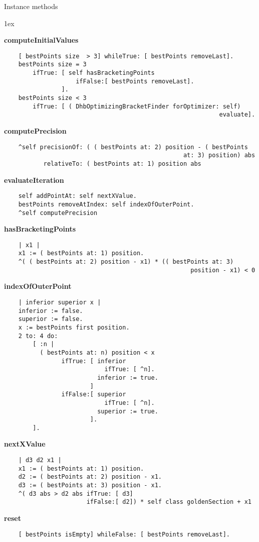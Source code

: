 Instance methods
{\parskip 1ex\par\noindent}
{\bf computeInitialValues}
\begin{verbatim}
    [ bestPoints size  > 3] whileTrue: [ bestPoints removeLast].
    bestPoints size = 3
        ifTrue: [ self hasBracketingPoints
                    ifFalse:[ bestPoints removeLast].
                ].
    bestPoints size < 3
        ifTrue: [ ( DhbOptimizingBracketFinder forOptimizer: self) 
                                                            evaluate].

\end{verbatim}
{\bf computePrecision}
\begin{verbatim}
    ^self precisionOf: ( ( bestPoints at: 2) position - ( bestPoints 
                                                  at: 3) position) abs
           relativeTo: ( bestPoints at: 1) position abs

\end{verbatim}
{\bf evaluateIteration}
\begin{verbatim}
    self addPointAt: self nextXValue.
    bestPoints removeAtIndex: self indexOfOuterPoint.
    ^self computePrecision

\end{verbatim}
{\bf hasBracketingPoints}
\begin{verbatim}
    | x1 |
    x1 := ( bestPoints at: 1) position.
    ^( ( bestPoints at: 2) position - x1) * (( bestPoints at: 3) 
                                                    position - x1) < 0

\end{verbatim}
{\bf indexOfOuterPoint}
\begin{verbatim}
    | inferior superior x |
    inferior := false.
    superior := false.
    x := bestPoints first position.
    2 to: 4 do:
        [ :n |
          ( bestPoints at: n) position < x
                ifTrue: [ inferior
                            ifTrue: [ ^n].
                          inferior := true.
                        ]
                ifFalse:[ superior
                            ifTrue: [ ^n].
                          superior := true.
                        ].
        ].

\end{verbatim}
{\bf nextXValue}
\begin{verbatim}
    | d3 d2 x1 |
    x1 := ( bestPoints at: 1) position.
    d2 := ( bestPoints at: 2) position - x1.
    d3 := ( bestPoints at: 3) position - x1.
    ^( d3 abs > d2 abs ifTrue: [ d3]
                       ifFalse:[ d2]) * self class goldenSection + x1

\end{verbatim}
{\bf reset}
\begin{verbatim}
    [ bestPoints isEmpty] whileFalse: [ bestPoints removeLast].

\end{verbatim}

